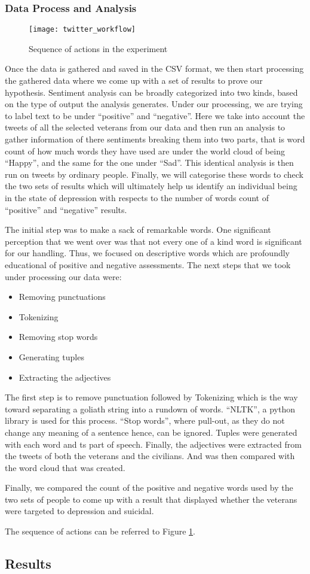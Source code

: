 \subsubsection{Data Process and Analysis}

\begin{figure}[h]
  \centering
  \caption{Sequence of actions in the experiment}
  \label{pic:workflow}
  \texttt{[image: twitter\_workflow]}
\end{figure}

Once the data is gathered and saved in the CSV format, we then start processing
the gathered data where we come up with a set of results to prove our
hypothesis. Sentiment analysis can be broadly categorized into two kinds, based
on the type of output the analysis generates. Under our processing, we are
trying to label text to be under \enquote{positive} and \enquote{negative}. Here we take into
account the tweets of all the selected veterans from our data and then run an
analysis to gather information of there sentiments breaking them into two parts,
that is word count of how much words they have used are under the world cloud
of being \enquote{Happy}, and the same for the one under \enquote{Sad}. This identical analysis
is then run on tweets by ordinary people. Finally, we will categorise these
words to check the two sets of results which will ultimately help us identify
an individual being in the state of depression with respects to the number of
words count of \enquote{positive} and \enquote{negative} results.

The initial step was to make a sack of remarkable words. One significant
perception that we went over was that not every one of a kind word is significant
for our handling. Thus, we focused on descriptive words which are profoundly
educational of positive and negative assessments. The next steps that we took
under processing our data were:

\begin{itemize}
  \item Removing punctuations
  \item Tokenizing
  \item Removing stop words
  \item Generating tuples
  \item Extracting the adjectives
\end{itemize}

The first step is to remove punctuation followed by Tokenizing which is the way
toward separating a goliath string into a rundown of words. “NLTK”, a python
library is used for this process. “Stop words”, where pull-out, as they do not
change any meaning of a sentence hence, can be ignored. Tuples were generated
with each word and ts part of speech. Finally, the adjectives were extracted
from the tweets of both the veterans and the civilians. And was then compared
with the word cloud that was created.

Finally, we compared the count of the positive and negative words used by the
two sets of people to come up with a result that displayed whether the veterans
were targeted to depression and suicidal.

The sequence of actions can be referred to Figure \ref{pic:workflow}.

\subsection{Results}
